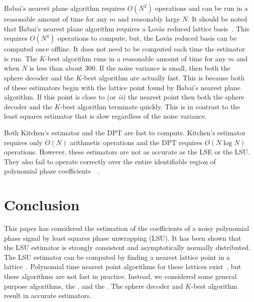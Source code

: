 \documentclass[journal]{IEEEtran}
\begin{document}
Babai's nearest plane algorithm requires $O(N^2)$ operations and can be run in a reasonable amount of time for any $m$ and reasonably large $N$. It should be noted that Babai's nearest plane algorithm requires a Lov\`as reduced lattice basis~\cite{Lenstra1982}.  This requires $O(N^4)$ operations to compute, but, the Lov\`as reduced basis can be computed once offline. It does not need to be computed each time the estimator is run. The $K$-best algorithm runs in a reasonable amount of time for any $m$ and when $N$ is less than about $300$. If the noise variance is small, then both the sphere decoder and the $K$-best algorithm are actually fast.  This is because both of these estimators begin with the lattice point found by Babai's nearest plane algorithm.  If this point is close to (or \emph{is}) the nearest point then both the sphere decoder and the $K$-best algorithm terminate quickly.  This is in contrast to the least squares estimator that is slow regardless of the noise variance. 

Both Kitchen's estimator and the DPT are fast to compute.  Kitchen's estimator requires only $O(N)$ arithmetic operations and the DPT requires $O(N \log N)$ operations.  However, these estimators are not as accurate as the LSE or the LSU.  They also fail to operate correctly over the entire identifiable region of polynomial phase coefficients~\cite{McKilliam2009IndentifiabliltyAliasingPolyphase}~\cite[Ch.~10]{McKilliam2010thesis}.



 
\section{Conclusion} \label{sec:conclusion}
 
This paper has considered the estimation of the coefficients of a noisy polynomial phase signal by least squares phase unwrapping (LSU). It has been shown that the LSU estimator is strongly consistent and asymptotically normally distributed. %
The LSU estimator can be computed by finding a nearest lattice point in a lattice~\cite{McKilliam2009asilomar_polyest_lattice}.  %
Polynomial time nearest point algorithms for these lattices exist~\cite[Sec 4.3]{McKilliam2010thesis}, but these algorithms are not fast in practice.  Instead, we considered some general purpose algorithms, the ,  and the . The sphere decoder and $K$-best algorithm result in accurate estimators.
\end{document}
